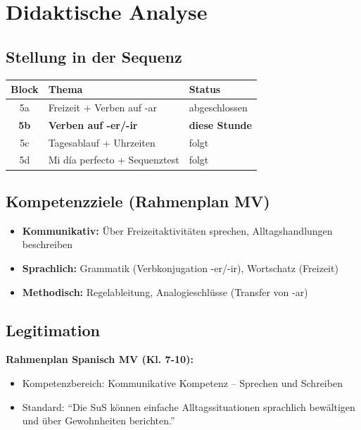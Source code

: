 \documentclass[11pt,a4paper]{article}
\begin{document}
\section{Didaktische Analyse}

\subsection{Stellung in der Sequenz}
\begin{tabular}{|c|l|l|}
\hline
\textbf{Block} & \textbf{Thema} & \textbf{Status} \\
\hline
5a & Freizeit + Verben auf -ar & abgeschlossen \\
\textbf{5b} & \textbf{Verben auf -er/-ir} & \textbf{diese Stunde} \\
5c & Tagesablauf + Uhrzeiten & folgt \\
5d & Mi día perfecto + Sequenztest & folgt \\
\hline
\end{tabular}

\subsection{Kompetenzziele (Rahmenplan MV)}
\begin{itemize}
    \item \textbf{Kommunikativ:} Über Freizeitaktivitäten sprechen, Alltagshandlungen beschreiben
    \item \textbf{Sprachlich:} Grammatik (Verbkonjugation -er/-ir), Wortschatz (Freizeit)
    \item \textbf{Methodisch:} Regelableitung, Analogieschlüsse (Transfer von -ar)
\end{itemize}

\subsection{Legitimation}
\textbf{Rahmenplan Spanisch MV (Kl. 7-10):}
\begin{itemize}
    \item Kompetenzbereich: Kommunikative Kompetenz -- Sprechen und Schreiben
    \item Standard: ``Die SuS können einfache Alltagssituationen sprachlich bewältigen und über Gewohnheiten berichten.''
\end{itemize}
\end{document}
